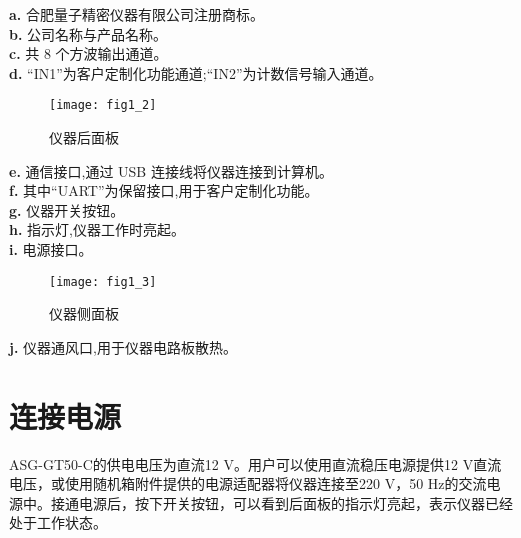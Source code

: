 \noindent \textbf{a.} 合肥量子精密仪器有限公司注册商标。\\
\textbf{b.} 公司名称与产品名称。\\
\textbf{c.} 共 8 个方波输出通道。\\
\textbf{d.} “IN1”为客户定制化功能通道;“IN2”为计数信号输入通道。

\begin{figure}[ht]
\centering
\texttt{[image: fig1\_2]}
\caption{仪器后面板}\label{fig:fig1_2}
\end{figure}

\noindent \textbf{e.} 通信接口,通过 USB 连接线将仪器连接到计算机。\\
\textbf{f.} 其中“UART”为保留接口,用于客户定制化功能。\\
\textbf{g.} 仪器开关按钮。\\
\textbf{h.} 指示灯,仪器工作时亮起。\\
\textbf{i.} 电源接口。

\begin{figure}[ht]
\centering
\texttt{[image: fig1\_3]}
\caption{仪器侧面板}\label{fig:fig1_3}
\end{figure}
\noindent \textbf{j.} 仪器通风口,用于仪器电路板散热。


\section{\heiti 连接电源}
ASG-GT50-C的供电电压为直流12 V。用户可以使用直流稳压电源提供12 V直流电压，或使用随机箱附件提供的电源适配器将仪器连接至220 V，50 Hz的交流电源中。接通电源后，按下开关按钮，可以看到后面板的指示灯亮起，表示仪器已经处于工作状态。

